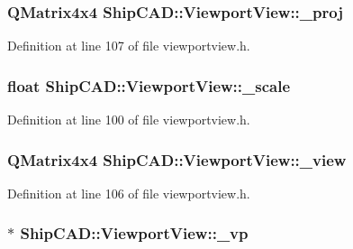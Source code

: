 \hypertarget{classShipCAD_1_1ViewportView_abb5933e4e5cbe5c97be2b63164cc8380}{
\subsubsection[{\-\_\-proj}]{\setlength{\rightskip}{0pt plus 5cm}Q\-Matrix4x4 Ship\-C\-A\-D\-::\-Viewport\-View\-::\-\_\-proj\hspace{0.3cm}{\ttfamily [protected]}}}\label{classShipCAD_1_1ViewportView_abb5933e4e5cbe5c97be2b63164cc8380}


Definition at line 107 of file viewportview.\-h.

\hypertarget{classShipCAD_1_1ViewportView_a808cc636969188f7c04c97902ecbe9d5}{
\subsubsection[{\-\_\-scale}]{\setlength{\rightskip}{0pt plus 5cm}float Ship\-C\-A\-D\-::\-Viewport\-View\-::\-\_\-scale\hspace{0.3cm}{\ttfamily [protected]}}}\label{classShipCAD_1_1ViewportView_a808cc636969188f7c04c97902ecbe9d5}


Definition at line 100 of file viewportview.\-h.

\hypertarget{classShipCAD_1_1ViewportView_a56588119357f01d0764219252695e9c5}{
\subsubsection[{\-\_\-view}]{\setlength{\rightskip}{0pt plus 5cm}Q\-Matrix4x4 Ship\-C\-A\-D\-::\-Viewport\-View\-::\-\_\-view\hspace{0.3cm}{\ttfamily [protected]}}}\label{classShipCAD_1_1ViewportView_a56588119357f01d0764219252695e9c5}


Definition at line 106 of file viewportview.\-h.

\hypertarget{classShipCAD_1_1ViewportView_a9d980ea46c1638d05221dc71e666da04}{
\subsubsection[{\-\_\-vp}]{$\ast$ Ship\-C\-A\-D\-::\-Viewport\-View\-::\-\_\-vp\hspace{0.3cm}{\ttfamily [protected]}}}\label{classShipCAD_1_1ViewportView_a9d980ea46c1638d05221dc71e666da04}


